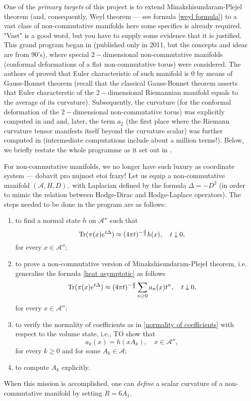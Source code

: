 \documentclass{article}
\begin{document}
One of the {\it primary targets} of this project is to extend Minakshisundaram-Plejel theorem (and, consequently, Weyl theorem --- see formula \eqref{weyl formula}) to a vast class of non-commutative manifolds {\color{red} here some specifics is already required. "Vast" is a good word, but you have to supply some evidence that it is justified}. This grand program began in \cite{ConnesTretkoff} (published only in 2011, but the concepts and ideas are from 90's), where special $2-$dimensional non-commutative manifolds (conformal deformations of a flat non-commutative torus) were considered. The authors of \cite{ConnesTretkoff} proved that Euler characteristic of such manifold is $0$ by means of Gauss-Bonnet theorem (recall that the classical Gauss-Bonnet theorem asserts that Euler characterstic of the $2-$dimensional Riemannian manifold equals to the average of its curvature). Subsequently, the curvature (for the conformal deformation of the $2-$dimensional non-commutative torus) was explicitly computed in \cite{ConnesMoscovici_curvature} and \cite{FathizadehKhalkhali} and, later, the term $a_2$ (the first place where the Riemann curvature tensor manifests itself beyond the curvature
scalar) was further computed in \cite{ConnesFathizadeh} (intermediate computations include about a million terms!). Below, we briefly restate the whole programme as it set out in \cite{ConnesTretkoff}.  

For non-commutative manifolds, we no longer have such luxury as coordinate system {\color{red}--- dobavit pro nujnost etoi frazy!} Let us equip a non-commutative manifold $(\mathcal{A},H,D),$ with Laplacian defined by the formula $\Delta=-D^2$ (in order to mimic the relation between Hodge-Dirac and Hodge-Laplace operators). The steps needed to be done in the program are as follows:
\begin{enumerate}
\item\label{raph1} to find a normal state $h$ on $\mathcal{A}''$ such that
\begin{equation}\label{raph1 eq}
{\rm Tr}(\pi(x)e^{t\Delta})\approx (4\pi t)^{-\frac{d}{2}} h(x),\quad t\downarrow0,
\end{equation}
for every $x\in\mathcal{A}'';$
\item\label{raph2} to prove a non-commutative version of Minakshisundaram-Plejel theorem, i.e. generalise the formula \eqref{heat asymptotic} as follows
$${\rm Tr}(\pi(x)e^{t\Delta})\approx (4\pi t)^{-\frac{d}{2}} \sum_{n\geq0}a_n(x)t^n,\quad t\downarrow0,$$
for every $x\in\mathcal{A}'';$
\item\label{raph3} to verify the normality of coefficients as in \eqref{normality of coefficients} with respect to the volume state, i.e., TO show that
$$a_k(x)=h(xA_k),\quad x\in\mathcal{A}'',$$
for every $k\geq0$ and for some $A_k\in\mathcal{A};$ 
\item\label{raph4} to compute $A_k$ explicitly.
\end{enumerate}
When this mission is accomplished, one can {\it define} a scalar curvature of a non-commutative manifold by setting $R=6A_1.$
\end{document}
